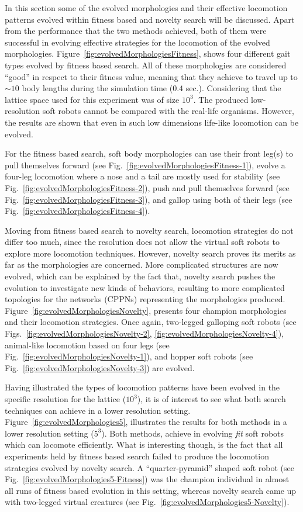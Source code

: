 In this section some of the evolved morphologies and their effective locomotion patterns evolved within fitness based and novelty search will be discussed. Apart from the performance that the two methods achieved, both of them were successful in evolving effective strategies for the locomotion of the evolved morphologies. Figure~\ref{fig:evolvedMorphologiesFitness}, shows four different gait types evolved by fitness based search. All of these morphologies are considered ``good'' in respect to their fitness value, meaning that they achieve to travel up to $\sim 10$ body lengths during the simulation time ($0.4$ sec.). Considering that the lattice space used for this experiment was of size $10^3$. The produced low-resolution soft robots cannot be compared with the real-life organisms. However, the results are shown that even in such low dimensions life-like locomotion can be evolved. 

For the fitness based search, soft body morphologies can use their front leg(s) to pull themselves forward (see Fig.~\ref{fig:evolvedMorphologiesFitness-1}), evolve a four-leg locomotion where a nose and a tail are mostly used for stability (see Fig.~\ref{fig:evolvedMorphologiesFitness-2}), push and pull themselves forward (see Fig.~\ref{fig:evolvedMorphologiesFitness-3}), and gallop using both of their legs (see Fig.~\ref{fig:evolvedMorphologiesFitness-4}). 

Moving from fitness based search to novelty search, locomotion strategies do not differ too much, since the resolution does not allow the virtual soft robots to explore more locomotion techniques. However, novelty search proves its merits as far as the morphologies are concerned. More complicated structures are now evolved, which can be explained by the fact that, novelty search pushes the evolution to investigate new kinds of behaviors, resulting to more complicated topologies for the networks (CPPNs) representing the morphologies produced. Figure~\ref{fig:evolvedMorphologiesNovelty}, presents four champion morphologies and their locomotion strategies. Once again, two-legged galloping soft robots (see Figs.~\ref{fig:evolvedMorphologiesNovelty-2}, \ref{fig:evolvedMorphologiesNovelty-4}), animal-like locomotion based on four legs (see Fig.~\ref{fig:evolvedMorphologiesNovelty-1}), and hopper soft robots (see Fig.~\ref{fig:evolvedMorphologiesNovelty-3}) are evolved.

Having illustrated the types of locomotion patterns have been evolved in the specific resolution for the lattice ($10^3$), it is of interest to see what both search techniques can achieve in a lower resolution setting. Figure~\ref{fig:evolvedMorphologies5}, illustrates the results for both methods in a lower resolution setting ($5^3$). Both methods, achieve in evolving \emph{fit} soft robots which can locomote efficiently. What is interesting though, is the fact that all experiments held by fitness based search failed to produce the locomotion strategies evolved by novelty search. A ``quarter-pyramid'' shaped soft robot (see Fig.~\ref{fig:evolvedMorphologies5-Fitness}) was the champion individual in almost all runs of fitness based evolution in this setting, whereas novelty search came up with two-legged virtual creatures (see Fig.~\ref{fig:evolvedMorphologies5-Novelty}).

